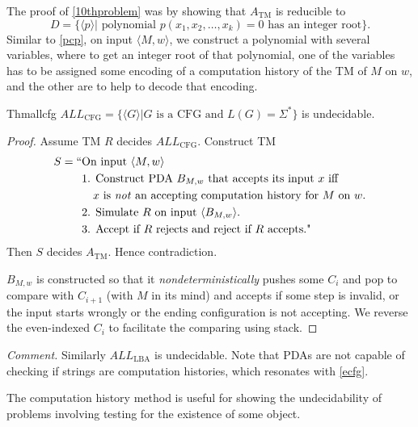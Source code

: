 The proof of \ref{10thproblem} was by showing that $A_{\mathrm{TM}}$ is reducible to
\[
  D=\{\langle p\rangle|\text{ polynomial }p(x_1,x_2,\dots,x_k)=0\text{ has an integer root}\}.
\]
Similar to \ref{pcp}, on input $\langle M,w\rangle$, we construct a polynomial with several variables, where to get an integer root of that polynomial, one of the variables has to be assigned some encoding of a computation history of the TM of $M$ on $w$, and the other are to help to decode that encoding.

\begin{reference}{Thm}{allcfg}
  $ALL_{\mathrm{CFG}}=\{\langle G\rangle|G\text{ is a CFG and }L(G)=\Sigma^*\}$ is undecidable.
\end{reference}

\begin{proof}
  Assume TM $R$ decides $ALL_{\mathrm{CFG}}$. Construct TM
  \begin{align*}
    S=\text{``} & \text{On input }\langle M,w\rangle                                                 \\
                & \text{1. Construct PDA }B_{M,w}\text{ that accepts its input }x\text{ iff }        \\
                & \quad x\text{ is \textit{not} an accepting computation history for }M\text{ on }w. \\
                & \text{2. Simulate }R\text{ on input }\langle B_{M,w}\rangle.                       \\
                & \text{3. Accept if }R\text{ rejects and reject if }R\text{ accepts."}
  \end{align*}
  Then $S$ decides $A_{\mathrm{TM}}$. Hence contradiction.

  $B_{M,w}$ is constructed so that it \textit{nondeterministically} pushes some $C_i$ and pop to compare with $C_{i+1}$ (with $M$ in its mind) and accepts if some step is invalid, or the input starts wrongly or the ending configuration is not accepting. We reverse the even-indexed $C_i$ to facilitate the comparing using stack.
\end{proof}

\textit{Comment.} Similarly $ALL_{\mathrm{LBA}}$ is undecidable. Note that PDAs are not capable of checking if strings are computation histories, which resonates with \ref{ecfg}.

The computation history method is useful for showing the undecidability of problems involving testing for the existence of some object.

